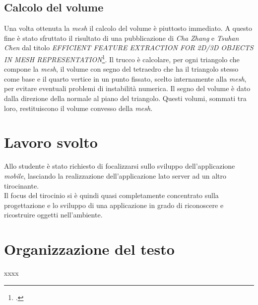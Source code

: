 \subsection{Calcolo del volume}
Una volta ottenuta la \emph{mesh} il calcolo del volume è piuttosto immediato. A questo fine è stato sfruttato il risultato di una pubblicazione di \emph{Cha Zhang} e \emph{Tsuhan Chen} dal titolo \emph{EFFICIENT FEATURE EXTRACTION FOR 2D/3D OBJECTS
IN MESH REPRESENTATION}\footcite{site: http://research.microsoft.com/en-us/um/people/chazhang/publications/icip01_ChaZhang.pdf}.
Il trucco è calcolare, per ogni triangolo che compone la \emph{mesh}, il volume con segno del tetraedro che ha il triangolo stesso come base e il quarto vertice in un punto fissato, scelto internamente alla \emph{mesh}, per evitare eventuali problemi di instabilità numerica. Il segno del volume è dato dalla direzione della normale al piano del triangolo. Questi volumi, sommati tra loro, restituiscono il volume convesso della \emph{mesh}.


\section{Lavoro svolto}
Allo studente è stato richiesto di focalizzarsi sullo sviluppo dell'applicazione \emph{mobile}, lasciando la realizzazione dell'applicazione lato server ad un altro tirocinante.\\
Il focus del tirocinio si è quindi quasi completamente concentrato sulla progettazione e lo sviluppo di una applicazione in grado di riconoscere e ricostruire oggetti nell'ambiente.


\section{Organizzazione del testo}
xxxx
%
%    
%    
%    
%    
%    

